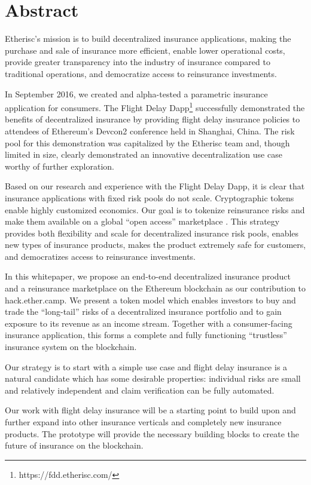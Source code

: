 \documentclass[12pt]{article}
\begin{document}
\newpage

\section{Abstract}

Etherisc's mission is to build decentralized insurance applications, making the purchase and sale of insurance more efficient, enable lower operational costs, provide greater transparency into the industry of insurance compared to traditional operations, and democratize access to reinsurance investments.  

In September 2016, we created and alpha-tested a parametric insurance application for consumers. The Flight Delay Dapp\footnote{https://fdd.etherisc.com/} successfully demonstrated the benefits of decentralized insurance by providing flight delay insurance policies to attendees of Ethereum's Devcon2 conference held in Shanghai, China. The risk pool for this demonstration was capitalized by the Etherisc team and, though limited in size, clearly demonstrated an innovative decentralization use case worthy of further exploration.

Based on our research and experience with the Flight Delay Dapp, it is clear that insurance applications with fixed risk pools do not scale. Cryptographic tokens enable highly customized economics. Our goal is to tokenize reinsurance risks and make them available on a global “open access” marketplace . This strategy provides both flexibility and scale for decentralized insurance risk pools, enables new types of insurance products, makes the product extremely safe for customers, and democratizes access to reinsurance investments.

In this whitepaper, we propose an end-to-end decentralized insurance product and a reinsurance marketplace on the Ethereum blockchain as our contribution to hack.ether.camp. We present a token model which enables investors to buy and trade the “long-tail” risks of a decentralized insurance portfolio and to gain exposure to its revenue as an income stream. Together with a consumer-facing insurance application, this forms a complete and fully functioning “trustless” insurance system on the blockchain.

Our strategy is to start with a simple use case and flight delay insurance is a natural candidate which has some desirable properties: individual risks are small and relatively independent and claim verification can be fully automated. 

Our work with flight delay insurance will be a starting point to build upon and further expand into other insurance verticals and completely new insurance products. The prototype will provide the necessary building blocks to create the future of insurance on the blockchain.
\end{document}

